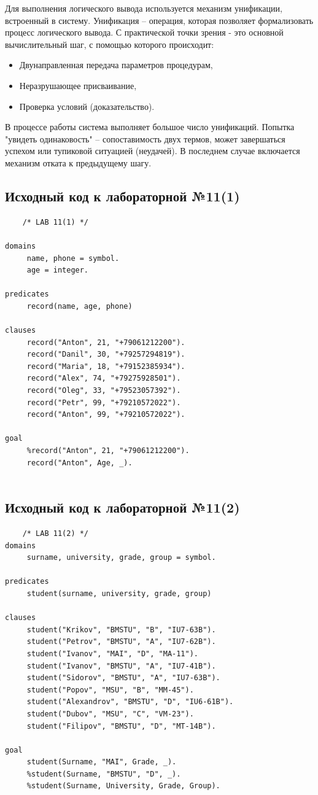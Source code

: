 \documentclass[12pt]{report}
\begin{document}
Для выполнения логического вывода используется механизм унификации, встроенный в систему.
Унификация – операция, которая позволяет формализовать процесс логического вывода. С практической точки зрения  - это основной вычислительный шаг, с помощью которого происходит:
\begin{itemize}
	\item Двунаправленная передача параметров процедурам,
	\item Неразрушающее присваивание,
	\item Проверка условий (доказательство).
\end{itemize}

В процессе работы система выполняет большое число унификаций.  Попытка "увидеть одинаковость" – сопоставимость двух термов, может завершаться успехом или тупиковой ситуацией (неудачей). В последнем случае включается механизм отката к предыдущему шагу.



\newpage
\subsection*{Исходный код к лабораторной №11(1)}
\begin{lstlisting}
	/* LAB 11(1) */

domains 
	 name, phone = symbol.
	 age = integer.
	
predicates 
	 record(name, age, phone)
	
clauses
	 record("Anton", 21, "+79061212200").
	 record("Danil", 30, "+79257294819").
	 record("Maria", 18, "+79152385934").
	 record("Alex", 74, "+79275928501").
	 record("Oleg", 33, "+79523057392").
	 record("Petr", 99, "+79210572022").
	 record("Anton", 99, "+79210572022").
	 
goal 
	 %record("Anton", 21, "+79061212200").
	 record("Anton", Age, _).
   
\end{lstlisting}


\subsection*{Исходный код к лабораторной №11(2)}
\begin{lstlisting}
	/* LAB 11(2) */
domains 
	 surname, university, grade, group = symbol.
	 
predicates
	 student(surname, university, grade, group)
	 
clauses
	 student("Krikov", "BMSTU", "B", "IU7-63B").
	 student("Petrov", "BMSTU", "A", "IU7-62B").
	 student("Ivanov", "MAI", "D", "MA-11").
	 student("Ivanov", "BMSTU", "A", "IU7-41B").
	 student("Sidorov", "BMSTU", "A", "IU7-63B").
	 student("Popov", "MSU", "B", "MM-45").
	 student("Alexandrov", "BMSTU", "D", "IU6-61B").
	 student("Dubov", "MSU", "C", "VM-23").   
	 student("Filipov", "BMSTU", "D", "MT-14B").
	 
goal
	 student(Surname, "MAI", Grade, _).
	 %student(Surname, "BMSTU", "D", _).
	 %student(Surname, University, Grade, Group).
   
\end{lstlisting}



	
\end{document}
